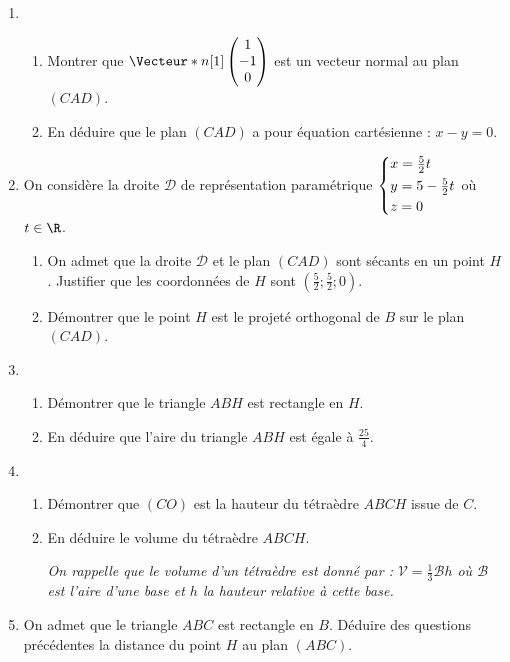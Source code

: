 \begin{enumerate}
	\item 
	
	\begin{enumerate}
		\item Montrer que $\Vecteur*{n}[1]\begin{pmatrix}1\\-1\\0\end{pmatrix}$ est un vecteur normal au plan $(CAD)$.
		\item En déduire que le plan $(CAD)$ a pour équation cartésienne : $x-y=0$.
	\end{enumerate}
	\item On considère la droite $\mathcal{D}$ de représentation paramétrique $\begin{dcases} x=\tfrac52t\\y=5-\tfrac52t\\z=0\end{dcases}$ où $t \in \R$.
	
	\begin{enumerate}
		\item On admet que la droite $\mathcal{D}$ et le plan $(CAD)$ sont sécants en un point $H$. Justifier que les coordonnées de $H$ sont $\left(\frac{5}{2};\frac{5}{2};0\right)$.
		\item Démontrer que le point $H$ est le projeté orthogonal de $B$ sur le plan $(CAD)$.
	\end{enumerate}
	\item 
	
	\begin{enumerate}
		\item Démontrer que le triangle $ABH$ est rectangle en $H$.
		\item En déduire que l'aire du triangle $ABH$ est égale à $\frac{25}{4}$.
	\end{enumerate}
	\item 
	
	\begin{enumerate}
		\item Démontrer que $(CO)$ est la hauteur du tétraèdre $ABCH$ issue de $C$.
		\item En déduire le volume du tétraèdre $ABCH$.
		
		\textit{On rappelle que le volume d'un tétraèdre est donné par : $\mathcal{V}=\frac{1}{3} \mathcal{B}h$ où $\mathcal{B}$ est l'aire d'une base et $h$ la hauteur relative à cette base.}
	\end{enumerate}
	\item On admet que le triangle $ABC$ est rectangle en $B$. Déduire des questions précédentes la distance du point $H$ au plan $(ABC)$.
\end{enumerate}